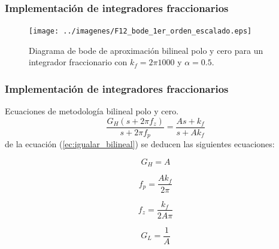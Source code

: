 \documentclass[10pt]{beamer}
\begin{document}
	\begin{frame}
		\frametitle{Implementación de integradores fraccionarios}
		\begin{figure}[hbtp]
		\caption{Diagrama de bode de aproximación bilineal polo y cero para un integrador fraccionario con $k_{f} = 2\pi 1000$ y  $\alpha = 0.5$.} 
		\label{fig:F12_bode_1er_orden_escalado}
		\centering
		\texttt{[image: ../imagenes/F12\_bode\_1er\_orden\_escalado.eps]}
	\end{figure}
	\end{frame}
	\begin{frame}
		\frametitle{Implementación de integradores fraccionarios}
		\begin{block}{Ecuaciones de metodología bilineal polo y cero.}
			 \begin{equation}
	 \frac{G_{H}(s + 2 \pi f_{z})}{s + 2 \pi f_{p}} = \frac{As + k_{f}}{s + A k_{f}}
	 \label{ec:igualar_bilineal}
	 \end{equation}
	 de la ecuación (\ref{ec:igualar_bilineal}) se deducen las siguientes ecuaciones:
	 
	 \begin{equation}
		 G_{H} = A
		 \label{ec:bilineal_gh}
	 \end{equation}
	 
	 \begin{equation}
	 	f_{p} = \frac{A k_{f}}{2 \pi}
	 	\label{ec:bilineal_fp}
	 \end{equation}
	 
	 \begin{equation}
		f_{z} = \frac{k_{f}}{ 2A \pi}
		\label{ec:bilineal_fz}
	 \end{equation}
	 
	 \begin{equation}
	 G_{L} = \frac{1}{A}
	 \label{ec:bilineal_gl}
	 \end{equation}
		\end{block}
	\end{frame}
\end{document}
